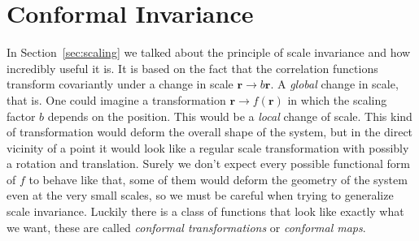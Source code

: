 \section{Conformal Invariance}
\label{ch:conf}

In Section~\ref{sec:scaling} we talked about the principle of scale invariance
and how incredibly useful it is. It is based on the fact that the correlation
functions transform covariantly under a change in scale $\mathbf{r}\rightarrow
b\mathbf{r}$. A \textit{global} change in scale, that is. One could imagine a
transformation $\mathbf{r}\rightarrow f(\mathbf{r})$ in which the scaling
factor $b$ depends on the position. This would be a \textit{local} change of
scale. This kind of transformation would deform the overall shape of the
system, but in the direct vicinity of a point it would look like a regular
scale transformation with possibly a rotation and translation. Surely we don't
expect every possible functional form of $f$ to behave like that, some of them would
deform the geometry of the system even at the very small scales, so we must be
careful when trying to generalize scale invariance. Luckily there is a class of
functions that look like exactly what we want, these are called
\textit{conformal transformations} or \textit{conformal maps}.

